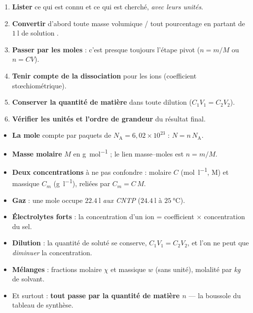 \documentclass[11pt,a4paper]{article}
\newcommand{\NA}{N_{\!\text{A}}}
\begin{document}
\begin{methode}
\begin{enumerate}[leftmargin=1.8em,topsep=2pt,itemsep=1.5pt]
  \item \textbf{Lister} ce qui est connu et ce qui est cherché, \emph{avec leurs unités}.
  \item \textbf{Convertir} d'abord toute masse volumique / tout pourcentage en partant de
        \og $\SI{1}{\litre}$ de solution \fg{}.
  \item \textbf{Passer par les moles} : c'est presque toujours l'étape pivot ($n = m/M$ ou $n = CV$).
  \item \textbf{Tenir compte de la dissociation} pour les ions (coefficient stœchiométrique).
  \item \textbf{Conserver la quantité de matière} dans toute dilution ($C_1V_1 = C_2V_2$).
  \item \textbf{Vérifier les unités et l'ordre de grandeur} du résultat final.
\end{enumerate}
\end{methode}

\begin{tcolorbox}[boxbase,colback=primarydark!6,colframe=primarydark,
   title={\textsc{L'essentiel de la Fiche 4}}]
\begin{itemize}[leftmargin=1.5em,topsep=2pt,itemsep=2pt]
  \item \textbf{La mole} compte par paquets de $\NA = 6{,}02\times10^{23}$ : $N = n\,\NA$.
  \item \textbf{Masse molaire} $M$ en \si{\gram\per\mole} ; le lien masse–moles est $n = m/M$.
  \item \textbf{Deux concentrations} à ne pas confondre : molaire $C$ (\si{\mole\per\litre}, M) et
        massique $C_m$ (\si{\gram\per\litre}), reliées par $C_m = C\,M$.
  \item \textbf{Gaz} : une mole occupe $\SI{22.4}{\litre}$ \emph{aux CNTP} ($\SI{24.4}{\litre}$ à $\SI{25}{\celsius}$).
  \item \textbf{Électrolytes forts} : la concentration d'un ion = coefficient $\times$ concentration du sel.
  \item \textbf{Dilution} : la quantité de soluté se conserve, $C_1V_1 = C_2V_2$, et l'on ne peut que
        \emph{diminuer} la concentration.
  \item \textbf{Mélanges} : fractions molaire $\chi$ et massique $w$ (sans unité), molalité par \emph{kg} de solvant.
  \item Et surtout : \textbf{tout passe par la quantité de matière $n$} — la boussole du tableau de synthèse.
\end{itemize}
\end{tcolorbox}
\end{document}

